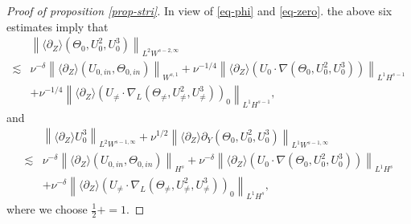 \documentclass[12pt]{article}
\def\e{\mathrm{e}}
\def\d{\mathrm{d}}
\newcommand{\wtb}{\langle\partial_Z\rangle }
\numberwithin{equation}{section}
\begin{document}
\begin{proof}[Proof of proposition \ref{prop-stri}]
	In view of \eqref{eq-phi} and \eqref{eq-zero}. the above six estimates imply that
	\begin{equation}\label{ineq-dl}
		\begin{aligned}
			~&\left\|\wtb (\Theta_0,U_0^{2},U_0^{3}) \right \|_{L^2 W^{s-2,\infty}}\\
			\lesssim & \nu ^{-\delta} \left \| \wtb  (U_{0,in},\Theta_{0,in})  \right \| _{W^{s,1}}+\nu^{-1/4} \left \|  \wtb \left ( U_0\cdot \nabla (\Theta_0, U_0^2,U_0^3) \right ) \right \| _{L^1H^{s-1}} \\
			~& +\nu ^{-1/4} \left \|  \wtb  \left(U_{\neq}\cdot \nabla_L (\Theta_{\neq}, U_{\neq}^2, U_{\neq }^3)\right)_0 \right \|_{L^1H^{s-1}},
		\end{aligned}
	\end{equation}
	and
	\begin{equation}\label{ineq-gc}
	    \begin{aligned}
		~& \left\|\wtb  U_0^{3} \right \|_{L^2 W^{s-1,\infty}}+\nu^{1/2}\left\| \wtb \partial_Y (\Theta_0, U_0^2, U_0^{3}) \right \|_{L^1 W^{s-1,\infty}}\\
		\lesssim & \nu ^{-\delta} \left \|  \wtb  (U_{0,in},\Theta_{0,in}) \right \| _{H^s}+\nu^{-\delta} \left \| \wtb  \left ( U_0\cdot \nabla (\Theta_0, U_0^2,U_0^3) \right ) \right \| _{L^1H^s} \\
		~& +\nu ^{-\delta} \left \| \wtb  \left(U_{\neq}\cdot \nabla_L (\Theta_{\neq}, U_{\neq}^2, U_{\neq }^3)\right)_0 \right \|_{L^1H^s},
	\end{aligned}
	\end{equation}
	where we choose $\frac{1}{2}+=1$.


\end{proof}
\end{document}
